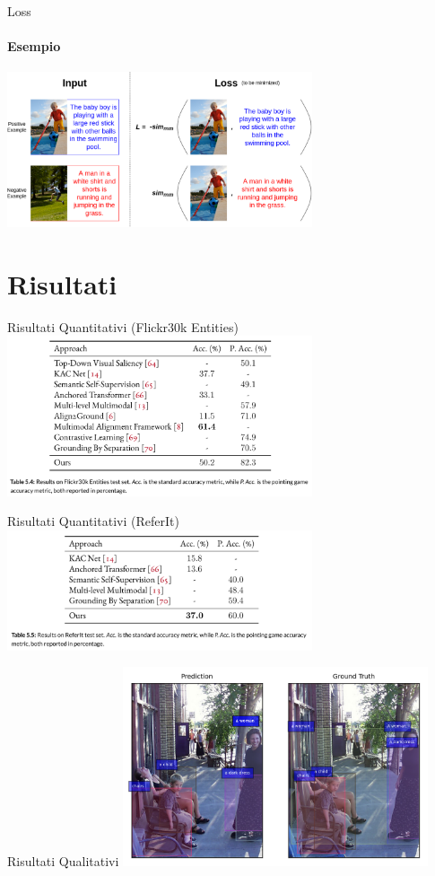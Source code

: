 \documentclass{beamer}
\begin{document}
\begin{frame}{Loss}
  \framesubtitle{Esempio}
  \centering
  \includegraphics[width=9cm]{images/loss.png}
\end{frame}

\section{Risultati}

\begin{frame}{Risultati Quantitativi (Flickr30k Entities)}
  \centering
  \includegraphics[width=9cm]{images/flickr30k-results.png}
\end{frame}

\begin{frame}{Risultati Quantitativi (ReferIt)}
  \centering
  \includegraphics[width=9cm]{images/referit-results.png}
\end{frame}

\begin{frame}{Risultati Qualitativi}
  \centering
  \includegraphics[width=9cm]{images/similing-woman.png}
\end{frame}
\end{document}
